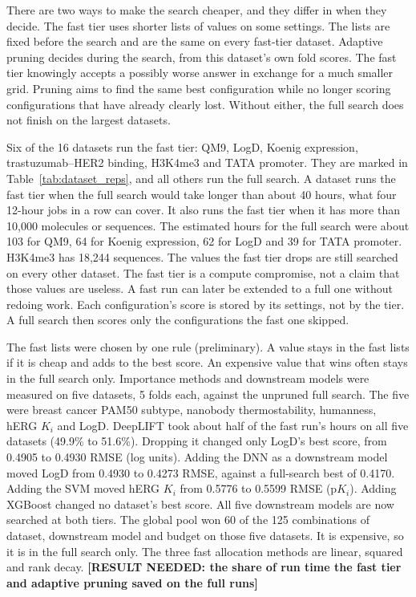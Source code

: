 There are two ways to make the search cheaper, and they differ in when they decide. The fast tier uses shorter lists of values on some settings. The lists are fixed before the search and are the same on every fast-tier dataset. Adaptive pruning decides during the search, from this dataset's own fold scores. The fast tier knowingly accepts a possibly worse answer in exchange for a much smaller grid. Pruning aims to find the same best configuration while no longer scoring configurations that have already clearly lost. Without either, the full search does not finish on the largest datasets.

Six of the 16 datasets run the fast tier: QM9, LogD, Koenig expression, trastuzumab--HER2 binding, H3K4me3 and TATA promoter. They are marked in Table~\ref{tab:dataset_reps}, and all others run the full search. A dataset runs the fast tier when the full search would take longer than about 40 hours, what four 12-hour jobs in a row can cover. It also runs the fast tier when it has more than 10,000 molecules or sequences. The estimated hours for the full search were about 103 for QM9, 64 for Koenig expression, 62 for LogD and 39 for TATA promoter. H3K4me3 has 18,244 sequences. The values the fast tier drops are still searched on every other dataset. The fast tier is a compute compromise, not a claim that those values are useless. A fast run can later be extended to a full one without redoing work. Each configuration's score is stored by its settings, not by the tier. A full search then scores only the configurations the fast one skipped.

The fast lists were chosen by one rule (preliminary). A value stays in the fast lists if it is cheap and adds to the best score. An expensive value that wins often stays in the full search only. Importance methods and downstream models were measured on five datasets, 5 folds each, against the unpruned full search. The five were breast cancer PAM50 subtype, nanobody thermostability, humanness, hERG $K_i$ and LogD. DeepLIFT took about half of the fast run's hours on all five datasets (49.9\% to 51.6\%). Dropping it changed only LogD's best score, from 0.4905 to 0.4930 RMSE (log units). Adding the DNN as a downstream model moved LogD from 0.4930 to 0.4273 RMSE, against a full-search best of 0.4170. Adding the SVM moved hERG $K_i$ from 0.5776 to 0.5599 RMSE (p$K_i$). Adding XGBoost changed no dataset's best score. All five downstream models are now searched at both tiers. The global pool won 60 of the 125 combinations of dataset, downstream model and budget on those five datasets. It is expensive, so it is in the full search only. The three fast allocation methods are linear, squared and rank decay. \textbf{[RESULT NEEDED: the share of run time the fast tier and adaptive pruning saved on the full runs]}

